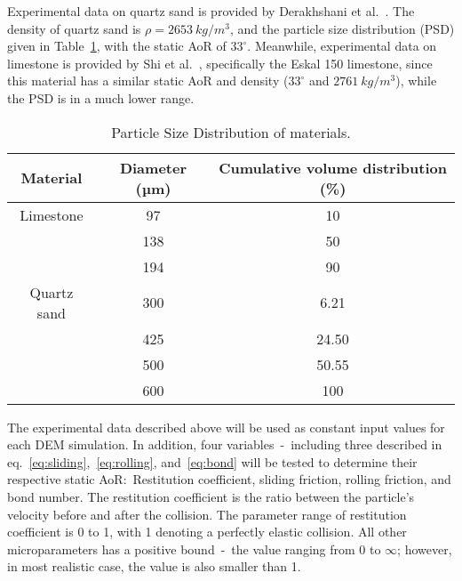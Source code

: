 Experimental data on quartz sand is provided by Derakhshani et al.~\cite{DERAKHSHANI2015127}. The density of quartz sand is $\rho = 2653~kg/m^3$, and the particle size distribution (PSD) given in Table~\ref{table:psd}, with the static AoR of $33^{\circ}$. Meanwhile, experimental data on limestone is provided by Shi et al.~\cite{SHI2020183}, specifically the Eskal 150 limestone, since this material has a similar static AoR and density ($33^{\circ}$ and $2761~kg/m^3$), while the PSD is in a much lower range. 


\begin{table}[H]
    \centering
    \begin{tabular}{c|cc}
    Material & Diameter (µm) & Cumulative volume distribution (\%) \\ \hline
    Limestone & 97 & 10 \\
     & 138 & 50 \\
     & 194 & 90 \\ \hline
    Quartz sand & 300 & 6.21 \\
     & 425 & 24.50 \\
     & 500 & 50.55 \\
     & 600 & 100
    \end{tabular}
    \caption{Particle Size Distribution of materials.}\label{table:psd}
\end{table}
        

The experimental data described above will be used as constant input values for each DEM simulation. In addition, four 
variables~-~including three described in eq.~\ref{eq:sliding},~\ref{eq:rolling}, and~\ref{eq:bond} will be tested to determine their respective static AoR:~Restitution coefficient, sliding friction, rolling friction, and bond number. The restitution coefficient is the ratio between the particle's velocity before and after the collision. The parameter range of restitution coefficient is 0 to 1, with 1 denoting a perfectly elastic collision. All other microparameters has a positive bound~-~the value ranging from 0 to $\infty$; however, in most realistic case, the value is also smaller than 1. 


